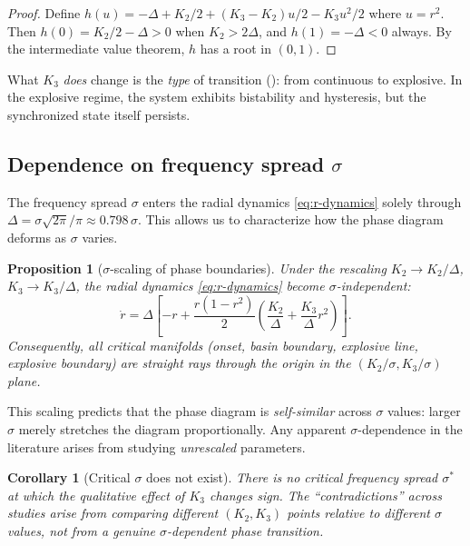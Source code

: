 \documentclass{article}
\newtheorem{proposition}{Proposition}
\newtheorem{corollary}{Corollary}
\begin{document}
\begin{proof}
  Define $h(u) = -\Delta + K_2/2 + (K_3-K_2)u/2 - K_3 u^2/2$ where $u=r^2$.
  Then $h(0)=K_2/2-\Delta>0$ when $K_2>2\Delta$, and $h(1)=-\Delta<0$ always.
  By the intermediate value theorem, $h$ has a root in $(0,1)$.
\end{proof}

What $K_3$ \emph{does} change is the \emph{type} of transition
(): from continuous to explosive.  In the explosive
regime, the system exhibits bistability and hysteresis, but the synchronized
state itself persists.

\subsection{Dependence on frequency spread $\sigma$}

The frequency spread $\sigma$ enters the radial dynamics \eqref{eq:r-dynamics}
solely through $\Delta = \sigma\sqrt{2\pi}/\pi \approx 0.798\,\sigma$.  This allows us to
characterize how the phase diagram deforms as $\sigma$ varies.

\begin{proposition}[$\sigma$-scaling of phase boundaries]
\label{prop:sigma-scaling}
  Under the rescaling $K_2\to K_2/\Delta$, $K_3\to K_3/\Delta$, the radial
  dynamics \eqref{eq:r-dynamics} become $\sigma$-independent:
  \begin{equation}
    \dot{r} = \Delta\left[-r + \frac{r(1-r^2)}{2}
      \left(\frac{K_2}{\Delta} + \frac{K_3}{\Delta}r^2\right)\right].
    \label{eq:rescaled}
  \end{equation}
  Consequently, all critical manifolds (onset, basin boundary, explosive line,
  explosive boundary) are straight rays through the origin in the
  $(K_2/\sigma, K_3/\sigma)$ plane.
\end{proposition}

This scaling predicts that the phase diagram is \emph{self-similar} across
$\sigma$ values: larger $\sigma$ merely stretches the diagram proportionally.
Any apparent $\sigma$-dependence in the literature arises from studying
\emph{unrescaled} parameters.

\begin{corollary}[Critical $\sigma$ does not exist]
  There is no critical frequency spread $\sigma^*$ at which the qualitative
  effect of $K_3$ changes sign.  The ``contradictions'' across studies arise
  from comparing different $(K_2,K_3)$ points relative to different $\sigma$
  values, not from a genuine $\sigma$-dependent phase transition.
\end{corollary}
\end{document}

